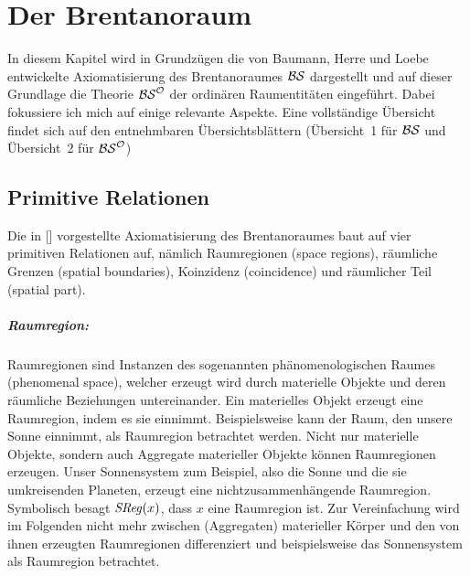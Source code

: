 \chapter{Der Brentanoraum}\label{chap:bs}

In diesem Kapitel wird in Grundzügen die von Baumann, Herre und Loebe entwickelte Axiomatisierung des Brentanoraumes $\mathcal{BS}$ dargestellt und auf dieser Grundlage die Theorie $\mathcal{BS}^{\mathcal{O}}$ der ordinären Raumentitäten eingeführt.
Dabei fokussiere ich mich auf einige relevante Aspekte.
Eine vollständige Übersicht findet sich auf den entnehmbaren Übersichtsblättern (Übersicht~1 für $\mathcal{BS}$ und Übersicht~2 für $\mathcal{BS}^{\mathcal{O}}$) 


\section{Primitive Relationen}\label{sec:bsprimitive}
Die in [\cite{baumann-r-2016-53-a}] vorgestellte Axiomatisierung des Brentanoraumes baut auf vier primitiven Relationen auf, nämlich Raumregionen (space regions), räumliche Grenzen (spatial boundaries), Koinzidenz (coincidence) und räumlicher Teil (spatial part). 



\paragraph{Raumregion:}
       Raumregionen
       sind Instanzen des sogenannten phänomenologischen Raumes (phenomenal space), welcher erzeugt wird durch materielle Objekte und deren räumliche Beziehungen untereinander.
       Ein materielles Objekt erzeugt eine Raumregion, indem es sie einnimmt. 
       Beispielsweise kann der Raum, den unsere Sonne einnimmt, als Raumregion betrachtet werden.
       Nicht nur materielle Objekte, sondern auch Aggregate materieller Objekte können Raumregionen erzeugen.
       Unser Sonnensystem zum Beispiel, also die Sonne und die sie umkreisenden Planeten, erzeugt
       eine nichtzusammenhängende Raumregion.
       Symbolisch besagt $\mathit{S\hspace*{-0.25ex}Reg}(x)$, dass $x$ eine Raumregion ist.
       Zur Vereinfachung wird im Folgenden nicht mehr zwischen (Aggregaten) materieller Körper und  den von ihnen erzeugten Raumregionen differenziert und beispielsweise das Sonnensystem als Raumregion betrachtet.
   
